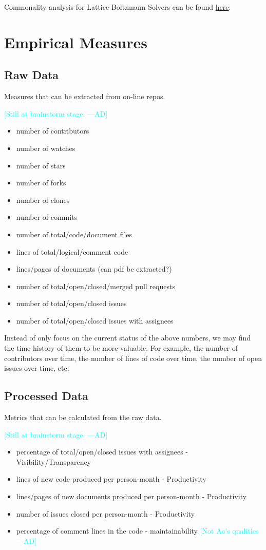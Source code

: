 \documentclass[letterpaper,cleveref]{lipics-v2019}
\newcommand{\authornote}[3]{\textcolor{#1}{[#3 ---#2]}}
\newcommand{\authornote}[3]{}
\newcommand{\ad}[1]{\authornote{cyan}{AD}{#1}} %
\theoremstyle{definition}
\begin{document}
Commonality analysis for Lattice Boltzmann Solvers can be found
\href{run:../Peter-Notes/Commonality-Analysis-LB-Systems.pdf}{here}.

\section{Empirical Measures} \label{SecEmpiricalMeasures}

\subsection{Raw Data}
Measures that can be extracted from on-line repos.

\ad{Still at brainstorm stage.}
\begin{itemize}
\item number of contributors
\item number of watches
\item number of stars
\item number of forks
\item number of clones
\item number of commits
\item number of total/code/document files
\item lines of total/logical/comment code
\item lines/pages of documents (can pdf be extracted?)
\item number of total/open/closed/merged pull requests
\item number of total/open/closed issues
\item number of total/open/closed issues with assignees
\end{itemize}

Instead of only focus on the current status of the above numbers, we may find
the time history of them to be more valuable. For example, the number of
contributors over time, the number of lines of code over time, the number of
open issues over time, etc.

\subsection{Processed Data}
Metrics that can be calculated from the raw data.

\ad{Still at brainstorm stage.}
\begin{itemize}
\item percentage of total/open/closed issues with assignees -
Visibility/Transparency
\item lines of new code produced per person-month - Productivity
\item lines/pages of new documents produced per person-month - Productivity
\item number of issues closed per person-month - Productivity
\item percentage of comment lines in the code - maintainability \ad{Not Ao's
qualities}
\end{itemize}
\end{document}
